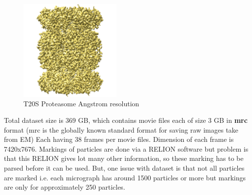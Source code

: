 \documentclass{report}
\begin{document}
\begin{figure}[H]
\includegraphics[width=0.45\textwidth]{EMPIAR-10025}
\centering
\captionsetup{justification=centering}
\caption{T20S Proteasome\protect{} Angstrom resolution}
\label{fig:EMPIAR-10025-3d-struct}
\end{figure}

Total dataset size is 369 GB, which contains movie files each of size 3 GB in \textbf{mrc} format (mrc is the globally known standard format for saving raw images take from EM) Each having 38 frames per movie files. Dimension of each frame is 7420x7676. Markings of particles are done via a RELION \cite{scheres2012relion} software but problem is that this RELION gives lot many other information, so these marking has to be parsed before it can be used. But, one issue with dataset is that not all particles are marked i.e. each micrograph has around 1500 particles or more but markings are only for approximately 250 particles.
\end{document}
